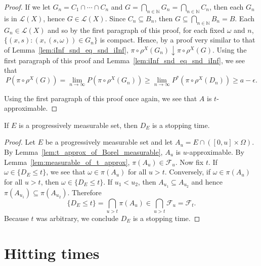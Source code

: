 \begin{proof}
  If we let $G_n = C_1 \cap \cdots \cap C_n$ and $G = \bigcap_{n \in \mathbb{N}} G_n = \bigcap_{n \in \mathbb{N}} C_n$, then
  each $G_n$ is in $\mathcal{L}(X)$, hence $G \in \mathcal{L}(X)$. Since $C_n \subseteq B_n$, then
  $G \subseteq \bigcap_{n \in \mathbb{N}} B_n = B$.
  Each $G_n \in \mathcal{L}(X)$ and so by the first paragraph of this proof, for each
  fixed $\omega$ and $n$, $\{(x,s): (x,(s,\omega)) \in G_n\}$
  is compact. Hence, by a proof very similar to that of Lemma~\ref{lem:iInf_snd_eq_snd_iInf},
  $\pi \circ \rho^X(G_n) \downarrow \pi \circ \rho^X(G)$.
  Using the first paragraph of this proof and Lemma~\ref{lem:iInf_snd_eq_snd_iInf},
  we see that $$P(\pi \circ \rho^X(G))
  = \lim_{n \to \infty} P(\pi \circ \rho^X(G_n)) \geq \lim_{n \to \infty} P^*(\pi \circ \rho^X(D_n)) \geq a - \epsilon.$$

  Using the first paragraph of this proof once again, we see that $A$ is $t$-approximable.
\end{proof}

\begin{theorem}\label{thm:debut_of_progr_meas_is_stop_time}
  \leanok
If $E$ is a progressively measurable set, then $D_E$ is a stopping time.
\end{theorem}

\begin{proof}
  Let $E$ be a progressively measurable set and let $A_u = E \cap ([0,u] \times \Omega)$.
  By Lemma~\ref{lem:t_approx_of_Borel_measurable}, $A_u$ is $u$-approximable.
  By Lemma~\ref{lem:measurable_of_t_approx}, $\pi(A_u) \in \mathcal{F}_u$.
  Now fix $t$. If $\omega \in \{D_E \leq t\}$, we see that $\omega \in \pi(A_u)$ for all $u > t$.
  Conversely, if $\omega \in \pi(A_u)$ for all $u > t$, then $\omega \in \{D_E \leq t\}$.
  If $u_1 < u_2$, then $A_{u_1} \subseteq A_{u_2}$ and hence $\pi(A_{u_1}) \subseteq
  \pi(A_{u_2})$. Therefore
  $$\{D_E \leq t\} = \bigcap_{u > t} \pi(A_u) \in \bigcap_{u > t} \mathcal{F}_u = \mathcal{F}_t.$$
  Because $t$ was arbitrary, we conclude $D_E$ is a stopping time.
\end{proof}

\section{Hitting times}

